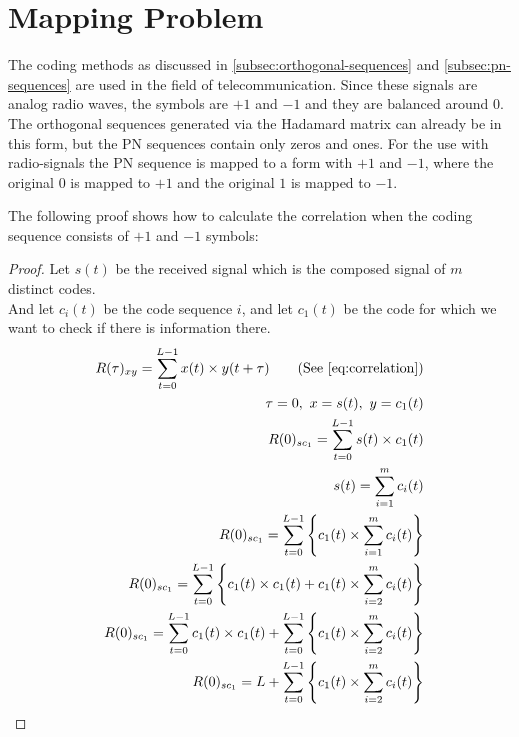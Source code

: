 
\section{Mapping Problem}
\label{sec:mapping-problem}

The coding methods as discussed in \autoref{subsec:orthogonal-sequences} and \autoref{subsec:pn-sequences} are used in the field of telecommunication.
Since these signals are analog radio waves, the symbols are $+1$ and $-1$ and they are balanced around $0$.
The orthogonal sequences generated via the Hadamard matrix can already be in this form, but the PN sequences contain only zeros and ones.
For the use with radio-signals the PN sequence is mapped to a form with $+1$ and $-1$, where the original $0$ is mapped to $+1$ and the original $1$ is mapped to $-1$.




The following proof  shows how to calculate the correlation when the coding sequence consists of $+1$ and $-1$ symbols: 

\begin{proof}
	Let $s(t)$ be the received signal which is the composed signal of $m$ distinct codes.\\
	And let $c_i(t)$ be the code sequence $i$, and let $c_1(t)$ be the code for which we want to check if there is information there. \\

	\begin{align*}
		R(\tau)_{xy} = \displaystyle\sum_{t = 0} ^ {L - 1} x(t) \times y(t + \tau)	\tag{See \autoref{eq:correlation}}
		\\ \tau = 0,\ x = s(t),\ y = c_1(t)	
		\\ R(0)_{sc_{1}} = \displaystyle\sum_{t = 0} ^ {L - 1} s(t) \times c_1(t)
		\\ s(t) = \displaystyle\sum_{i = 1} ^ {m} c_i(t)														
		\\ R(0)_{sc_{1}} = \displaystyle\sum_{t = 0} ^ {L - 1}  \Bigg\{  c_1(t)	\times \displaystyle\sum_{i = 1} ^ {m} c_i(t) \Bigg\}
		\\ R(0)_{sc_{1}} = \displaystyle\sum_{t = 0} ^ {L - 1} \Bigg\{ c_1(t) \times c_1(t) + c_1(t) \times  \displaystyle\sum_{i = 2} ^ {m} c_i(t) \Bigg\} 
		\\ R(0)_{sc_{1}} = \displaystyle\sum_{t = 0} ^ {L - 1} c_1(t) \times c_1(t) + \displaystyle\sum_{t = 0} ^ {L - 1} \Bigg\{ c_1(t) \times  \displaystyle\sum_{i = 2} ^ {m} c_i(t) \Bigg\} 
		\\ R(0)_{sc_{1}} = L + \displaystyle\sum_{t = 0} ^ {L - 1} \Bigg\{ c_1(t) \times  \displaystyle\sum_{i = 2} ^ {m} c_i(t) \Bigg\} 
	\end{align*}

\end{proof}

